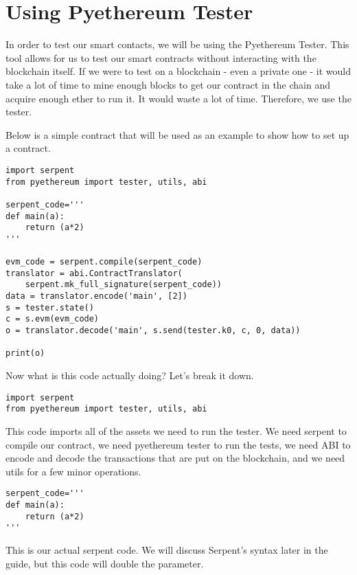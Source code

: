 \documentclass[12pt]{article}
\begin{document}
\section{Using Pyethereum Tester}

In order to test our smart contacts, we will be using the Pyethereum Tester. This tool allows for us to test our smart contracts without interacting with the blockchain itself. If we were to test on a blockchain - even a private one - it would take a lot of time to mine enough blocks to get our contract in the chain and acquire enough ether to run it. It would waste a lot of time. Therefore, we use the tester.

Below is a simple contract that will be used as an example to show how to set up a contract. \cite{test_contracts.py,Using pyethereum.tester}

\begin{lstlisting}[frame=single]
import serpent
from pyethereum import tester, utils, abi

serpent_code='''
def main(a):
	return (a*2)
'''

evm_code = serpent.compile(serpent_code)
translator = abi.ContractTranslator(
	serpent.mk_full_signature(serpent_code))
data = translator.encode('main', [2])
s = tester.state()
c = s.evm(evm_code)
o = translator.decode('main', s.send(tester.k0, c, 0, data))

print(o)
\end{lstlisting}

Now what is this code actually doing? Let's break it down.

\begin{lstlisting}
import serpent
from pyethereum import tester, utils, abi
\end{lstlisting}

This code imports all of the assets we need to run the tester. We need serpent to compile our contract, we need pyethereum tester to run the tests, we need ABI to encode and decode the transactions that are put on the blockchain, and we need utils for a few minor operations.

\begin{lstlisting}
serpent_code='''
def main(a):
	return (a*2)
'''
\end{lstlisting}

This is our actual serpent code. We will discuss Serpent's syntax later in the guide, but this code will double the parameter.
\end{document}
